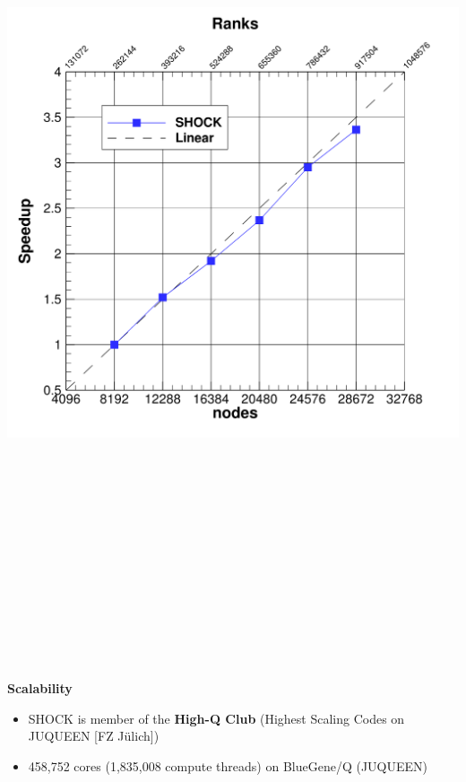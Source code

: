 \documentclass[a0,portrait]{a0poster}
\begin{document}
{{\begin{multicols}{3}
\includegraphics[height=260mm]{Scaling.png}

\textbf{Scalability}
\begin{itemize}
\item SHOCK is member of the \textbf{High-Q Club} \newline (Highest Scaling Codes on JUQUEEN [FZ J\"{u}lich])
\item 458,752 cores (1,835,008 compute threads) \newline on BlueGene/Q (JUQUEEN)
\end{itemize}


\end{multicols}}}
\end{document}
